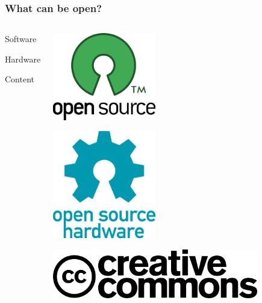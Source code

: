 \documentclass{beamer}
\begin{document}
\begin{frame}
  \frametitle{What can be open?}
  \begin{columns}
    \begin{center}
      \begin{LARGE}Software\end{LARGE}
      
      \vspace{5em}

      \begin{LARGE}Hardware\end{LARGE}

      \vspace{5em}

      \begin{LARGE}Content\end{LARGE}
    \end{center}
    \begin{center}
      \includegraphics[width=0.4\textwidth]{../img/opensource}

      \vspace{1em}

      \includegraphics[width=0.4\textwidth]{../img/opensourcehardware.png}

      \vspace{1em}

      \includegraphics[width=0.8\textwidth]{../img/cc.png}
    \end{center}
  \end{columns}

\end{frame}
\end{document}
